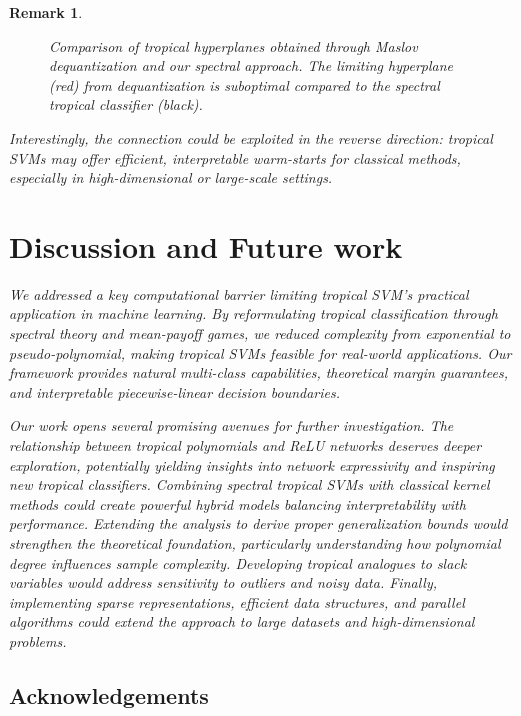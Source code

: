 \documentclass{article}
\newtheorem{remark}{Remark}
\begin{document}
\begin{remark}
\begin{figure}[h]
    \centering
    \resizebox{0.5\textwidth}{!}{\clipbox{0.15\width{} 0.15\height{} 0.15\width{} 0.15\height{}}{}}
    \caption{Comparison of tropical hyperplanes obtained through Maslov dequantization and our spectral approach. The limiting hyperplane (red) from dequantization is suboptimal compared to the spectral tropical classifier (black).}
    \label{fig:maslov_dequantization}
\end{figure}

Interestingly, the connection could be exploited in the reverse direction: tropical SVMs may offer efficient, interpretable warm-starts for classical methods, especially in high-dimensional or large-scale settings.

\section{Discussion and Future work}\label{sec:discussion}

We addressed a key computational barrier limiting tropical SVM's practical application in machine learning. By reformulating tropical classification through spectral theory and mean-payoff games, we reduced complexity from exponential to pseudo-polynomial, making tropical SVMs feasible for real-world applications. Our framework provides natural multi-class capabilities, theoretical margin guarantees, and interpretable piecewise-linear decision boundaries.

Our work opens several promising avenues for further investigation. The relationship between tropical polynomials and ReLU networks deserves deeper exploration, potentially yielding insights into network expressivity and inspiring new tropical classifiers. Combining spectral tropical SVMs with classical kernel methods could create powerful hybrid models balancing interpretability with performance. Extending the analysis to derive proper generalization bounds would strengthen the theoretical foundation, particularly understanding how polynomial degree influences sample complexity. Developing tropical analogues to slack variables would address sensitivity to outliers and noisy data. Finally, implementing sparse representations, efficient data structures, and parallel algorithms could extend the approach to large datasets and high-dimensional problems.

\subsection*{Acknowledgements}


\end{remark}
\end{document}
